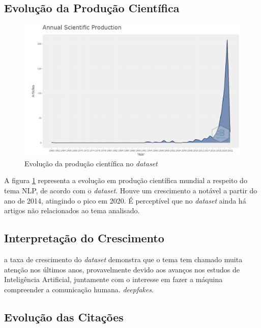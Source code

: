 \subsection{Evolução da Produção Científica}

\begin{figure}
    \centering
    \includegraphics[width=1\textwidth]{experiments/titofrota/PesquisaBibliometrica/Deepfakes/annual-plot.png}
    \caption{Evolução da produção científica no \textit{dataset}}
    \label{fig:evol:anual:DEEPFAKES@titofrota}
\end{figure}

A figura \ref{fig:evol:anual:DEEPFAKES@titofrota} representa a evolução em produção científica mundial a respeito do tema NLP, de acordo com o \textit{dataset}. Houve um crescimento a notável a partir do ano de 2014, atingindo o pico em 2020. 
É perceptível que no \textit{dataset} ainda há artigos não relacionados ao tema analisado.

\subsection{Interpretação do Crescimento} a taxa de crescimento do \textit{dataset} demonstra que o tema tem chamado muita atenção nos últimos anos, provavelmente devido aos avanços nos estudos de Inteligência Artificial, juntamente com o interesse em fazer a máquina compreender a comunicação humana. \textit{deepfakes}.

\subsection{Evolução das Citações}


